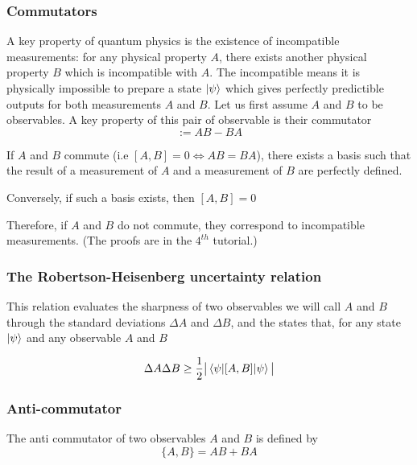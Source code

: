 \documentclass{article}
\begin{document}
\subsubsection*{Commutators}
A key property of quantum physics is the existence of incompatible measurements:
for any physical property $A$, there exists another physical property $B$ which
is incompatible with $A$. The incompatible means it is physically impossible to
prepare a state $\ket{\psi}$ which gives perfectly predictible outputs for both
measurements $A$ and $B$. Let us first assume $A$ and $B$ to be observables. A
key property of this pair of observable is their commutator
\begin{equation}
    [A,B]:= AB-BA
\end{equation}

If $A$ and $B$ commute (i.e $[A,B]=0 \Leftrightarrow AB = BA$), there exists a
basis such that the result of a measurement of $A$ and a measurement of $B$ are
perfectly defined.

Conversely, if such a basis exists, then $[A,B]=0$

Therefore, if $A$ and $B$ do not commute, they correspond to incompatible
measurements. (The proofs are in the $4^{th}$ tutorial.)

\subsubsection*{The Robertson-Heisenberg uncertainty relation}
This relation evaluates the sharpness of two observables we will call $A$ and
$B$ through the standard deviations $\Delta A$ and $\Delta B$, and the states
that, for any state $\ket{\psi}$ and any observable $A$ and $B$

\begin{equation}
    \Delta A \Delta B \geq \frac{1}{2}\big|\braket{\psi|[A,B]|\psi}\big|
\end{equation}

\subsubsection*{Anti-commutator}
The anti commutator of two observables $A$ and $B$ is defined by
\begin{equation}
    \{A,B\} = AB+BA
\end{equation}
\end{document}
